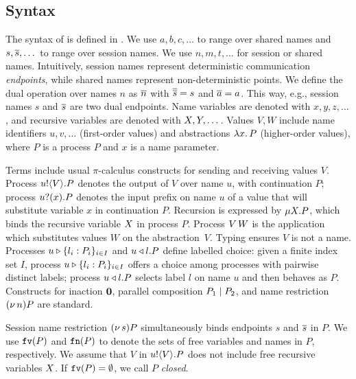 \subsection{Syntax} 
The syntax of \HOp is defined in .
We use $a,b,c, \dots$ 
to range over shared names
and $s, \overline{s}, \dots$
to range over 
session names. 
We use $n, m, t, \dots$ for session or shared names. 
Intuitively, session names
represent deterministic communication \emph{endpoints}, 
 while shared names represent non-deterministic points. 
We define the dual operation over names $n$ as $\overline{n}$ with
$\overline{\overline{s}} = s$ and $\overline{a} = a$.
This way, e.g., session names $s$ and $\overline{s}$ are two dual endpoints.
Name variables are denoted with $x, y, z, \dots$, 
and recursive variables are denoted with $X, Y, \dots$.
Values $V,W$ include 
name identifiers $u, v, \ldots$ (first-order values) 
and 
abstractions $\lambda x.\,P$ (higher-order values),
where $P$ is a process $P$ and $x$ is a name parameter.

 

{Terms} 
include  usual $\pi$-calculus constructs for sending and receiving values $V$.
Process $u ! \langle V \rangle . P$ denotes the output of   $V$
over name $u$, with continuation $P$;
process $u ? (x) . P$ denotes the input prefix on name $u$ of a value
that 
will substitute variable $x$ in continuation $P$. 
Recursion is expressed by $\mu X. P$,
which binds the recursive variable $X$ in process $P$.
Process 
$V\, {W}$ 
is the application
which substitutes values $W$ on the abstraction~$V$. 
Typing  ensures  $V$ is not a name.
Processes $u \triangleright \{l_i: P_i\}_{i \in I}$  and $u \triangleleft l . P$ define labelled choice:
given a finite index set $I$, process $u \triangleright \{l_i: P_i\}_{i \in I}$ offers a choice 
among processes with pairwise distinct labels;
 process $u \triangleleft l . P$ selects label $l$ on name $u$ and then behaves as $P$.
Constructs for 
inaction $\mathbf{0}$,  parallel composition $P_1 \;|\; P_2$, and 
name restriction $(\nu\, n) P$ are standard.

Session name restriction $(\nu\, s) P$ simultaneously binds endpoints $s$ and $\overline{s}$ in $P$.
We use $\mathtt{fv}(P)$ and $\mathtt{fn}(P)$ to denote the sets of free 
variables and names in $P$, respectively.
We assume that $V$ in $u ! \langle V \rangle .{P}$ does not include free recursive 
variables $X$. 
If $\mathtt{fv}(P) = \emptyset$, we call $P$ {\em closed}.

